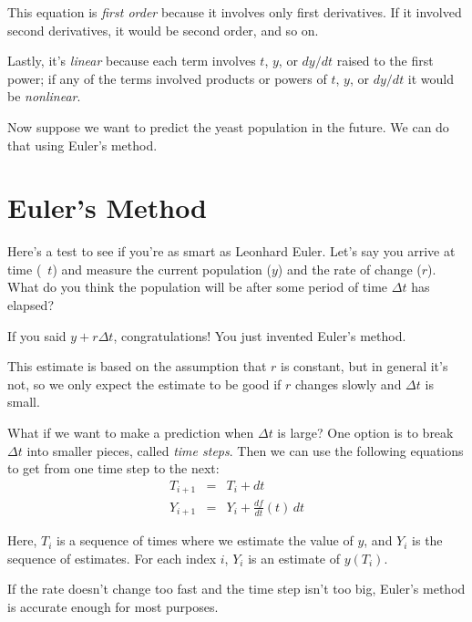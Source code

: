 
This equation is \emph{first order} because it involves only first
derivatives.  If it involved second derivatives, it would be second order,
and so on.


Lastly, it's \emph{linear} because each term involves $t$, $y$, or
$dy/dt$ raised to the first power; if any of the terms involved
products or powers of $t$, $y$, or $dy/dt$ it would be
\emph{nonlinear}.

Now suppose we want to predict the yeast population in the future.  We can do that using Euler's method.

\section{Euler's Method}

Here's a test to see if you're as smart as Leonhard Euler.  Let's say you arrive at time (~$t$) and measure the current population ($y$) and
the rate of change ($r$).  What do you think the population will
be after some period of time $\Delta t$ has elapsed?

If you said $y + r \Delta t$, congratulations!  You just invented
Euler's method.


This estimate is based on the assumption that $r$ is constant, but
in general it's not, so we only expect the estimate to be good if
$r$ changes slowly and $\Delta t$ is small. 

What if we want to make a prediction when $\Delta t$ is large?
One option is to break $\Delta t$ into smaller pieces, called
\emph{time steps}. Then we can use the following equations to get from one time step to the next:
\begin{eqnarray*}
T_{i+1} &=& T_i + dt                       \\
Y_{i+1} &=& Y_i + \frac{df}{dt}(t) \, dt          
\end{eqnarray*}

Here, $T_i$ is a sequence of times where we estimate the value of $y$, and $Y_i$ is the sequence of estimates.  
For each index $i$, $Y_i$ is an estimate of $y(T_i)$.


If the rate doesn't change too fast and the time step isn't
too big, Euler's method is accurate enough for most purposes.  

